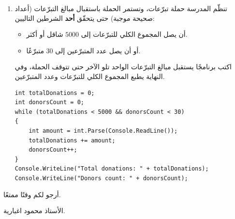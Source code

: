 \documentclass[14pt]{extarticle}
\begin{document}
\begin{enumerate}[resume, itemsep=2em]
\item تنظّم المدرسة حملة تبرّعات، وتستمر الحملة باستقبال مبالغ التبرّعات (أعداد صحيحة موجبة) حتى يتحقّق \textbf{أحد} الشرطين التاليين:
\begin{itemize}[nosep]
    \item أن يصل المجموع الكلي للتبرّعات إلى $5000$ شاقل أو أكثر.
    \item أو أن يصل عدد المتبرّعين إلى $30$ متبرّعًا.
\end{itemize}
اكتب برنامجًا يستقبل مبالغ التبرّعات الواحد تلو الآخر حتى تتوقف الحملة، وفي النهاية يطبع المجموع الكلي للتبرّعات وعدد المتبرّعين.
\ifwithsols
\begin{boxSolution}
\begin{english}
\begin{verbatim}
int totalDonations = 0;
int donorsCount = 0;
while (totalDonations < 5000 && donorsCount < 30)
{
    int amount = int.Parse(Console.ReadLine());
    totalDonations += amount;
    donorsCount++;
}
Console.WriteLine("Total donations: " + totalDonations);
Console.WriteLine("Donors count: " + donorsCount);
\end{verbatim}
\end{english}
\end{boxSolution}
\fi
\filbreak

\end{enumerate}

\vspace{1cm}
\begin{flushleft}
أرجو لكم وقتًا ممتعًا.

الأستاذ محمود اغبارية.
\end{flushleft}
\end{document}
